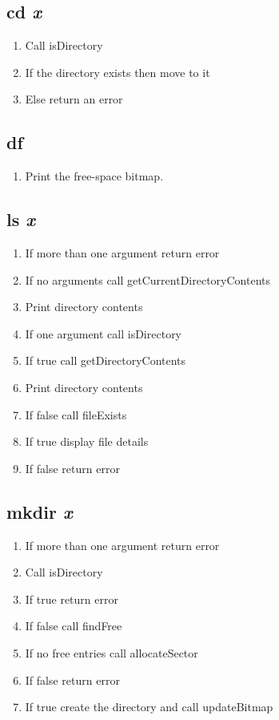 \documentclass[a4paper]{article}
\begin{document}
\subsection{cd \textit{x}}
\begin{enumerate}
\item Call isDirectory
\item If the directory exists then move to it
\item Else return an error
\end{enumerate}

\subsection{df}
\begin{enumerate}
\item Print the free-space bitmap.
\end{enumerate}

\subsection{ls \textit{x}}
\begin{enumerate}
\item If more than one argument return error
\item If no arguments call getCurrentDirectoryContents
\item Print directory contents
\item If one argument call isDirectory
\item If true call getDirectoryContents
\item Print directory contents
\item If false call fileExists
\item If true display file details
\item If false return error
\end{enumerate}

\subsection{mkdir \textit{x}}
\begin{enumerate}
\item If more than one argument return error
\item Call isDirectory
\item If true return error
\item If false call findFree
\item If no free entries call allocateSector
\item If false return error
\item If true create the directory and call updateBitmap
\end{enumerate}
\end{document}
